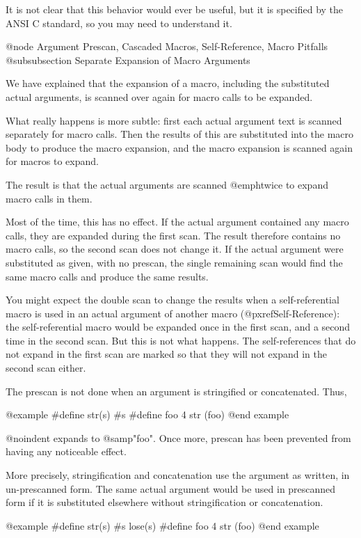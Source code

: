 {{It is not clear that this behavior would ever be useful, but it is specified
by the ANSI C standard, so you may need to understand it.

@node Argument Prescan, Cascaded Macros, Self-Reference, Macro Pitfalls
@subsubsection Separate Expansion of Macro Arguments

We have explained that the expansion of a macro, including the substituted
actual arguments, is scanned over again for macro calls to be expanded.

What really happens is more subtle: first each actual argument text is scanned
separately for macro calls.  Then the results of this are substituted into
the macro body to produce the macro expansion, and the macro expansion
is scanned again for macros to expand.

The result is that the actual arguments are scanned @emph{twice} to expand
macro calls in them.

Most of the time, this has no effect.  If the actual argument contained
any macro calls, they are expanded during the first scan.  The result
therefore contains no macro calls, so the second scan does not change it.
If the actual argument were substituted as given, with no prescan,
the single remaining scan would find the same macro calls and produce
the same results.

You might expect the double scan to change the results when a
self-referential macro is used in an actual argument of another macro
(@pxref{Self-Reference}): the self-referential macro would be expanded once
in the first scan, and a second time in the second scan.  But this is not
what happens.  The self-references that do not expand in the first scan are
marked so that they will not expand in the second scan either.

The prescan is not done when an argument is stringified or concatenated.
Thus,

@example
#define str(s) #s
#define foo 4
str (foo)
@end example

@noindent
expands to @samp{"foo"}.  Once more, prescan has been prevented from
having any noticeable effect.

More precisely, stringification and concatenation use the argument as
written, in un-prescanned form.  The same actual argument would be used in
prescanned form if it is substituted elsewhere without stringification or
concatenation.

@example
#define str(s) #s lose(s)
#define foo 4
str (foo)
@end example

}}
